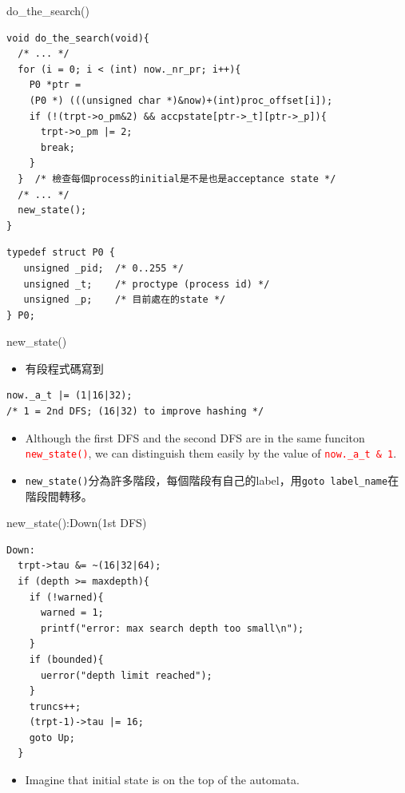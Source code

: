 \documentclass[12pt]{beamer}
\newcommand{\code}[1]{\texttt{#1}}
\begin{document}
\begin{frame}[fragile]{do\_the\_search()}
\begin{lstlisting}[basicstyle=\footnotesize\ttfamily]
void do_the_search(void){
  /* ... */
  for (i = 0; i < (int) now._nr_pr; i++){
    P0 *ptr = 
    (P0 *) (((unsigned char *)&now)+(int)proc_offset[i]);
    if (!(trpt->o_pm&2) && accpstate[ptr->_t][ptr->_p]){
      trpt->o_pm |= 2;
      break;
    }
  }  /* 檢查每個process的initial是不是也是acceptance state */
  /* ... */
  new_state();
}
\end{lstlisting}
\begin{lstlisting}[basicstyle=\footnotesize\ttfamily]
typedef struct P0 {
   unsigned _pid;  /* 0..255 */
   unsigned _t;    /* proctype (process id) */
   unsigned _p;    /* 目前處在的state */
} P0;
\end{lstlisting}
\end{frame}

\begin{frame}[fragile]{new\_state()}
\begin{itemize}
	\item 有段程式碼寫到
\end{itemize}
\begin{lstlisting}[basicstyle=\normalsize\ttfamily]
now._a_t |= (1|16|32);
/* 1 = 2nd DFS; (16|32) to improve hashing */
\end{lstlisting}
\begin{itemize}
	\item Although the first DFS and the second DFS are in the same funciton \textcolor{red}{\code{new\_state()}}, we can distinguish them easily by the value of \textcolor{red}{\code{now.\_a\_t \& 1}}.
	\item \code{new\_state()}分為許多階段，每個階段有自己的label，用\code{goto label\_name}在階段間轉移。
\end{itemize}
\end{frame}

\begin{frame}[fragile]{new\_state():Down(1st DFS)}
\begin{lstlisting}[basicstyle=\footnotesize\ttfamily]
Down:
  trpt->tau &= ~(16|32|64);
  if (depth >= maxdepth){
    if (!warned){ 
      warned = 1;
      printf("error: max search depth too small\n");
    }
    if (bounded){ 
      uerror("depth limit reached");
    }
    truncs++;
    (trpt-1)->tau |= 16;
    goto Up;
  }
\end{lstlisting}
\begin{itemize}
	\item Imagine that initial state is on the top of the automata.
\end{itemize}
\end{frame}
\end{document}
